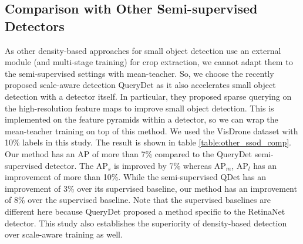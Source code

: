 \subsection{Comparison with Other Semi-supervised Detectors}
As other density-based approaches for small object detection use an external module (and multi-stage training) for crop extraction, we cannot adapt them to the semi-supervised settings with mean-teacher. So, we choose the recently proposed scale-aware detection QueryDet \cite{querydet-Yang-2022} as it also accelerates small object detection with a detector itself. In particular, they proposed sparse querying on the high-resolution feature maps to improve small object detection. This is implemented on the feature pyramids within a detector, so we can wrap the mean-teacher training on top of this method. We used the VisDrone dataset with 10\% labels in this study. The result is shown in table \ref{table:other_ssod_comp}. Our method has an AP of more than 7\% compared to the QueryDet semi-supervised detector. The $\textrm{AP}_{s}$ is improved by 7\% whereas $\textrm{AP}_{m}$, $\textrm{AP}_{l}$ has an improvement of more than 10\%. While the semi-supervised QDet has an improvement of 3\% over its supervised baseline, our method has an improvement of 8\% over the supervised baseline. Note that the supervised baselines are different here because QueryDet proposed a method specific to the RetinaNet \cite{retinanet-Lin-2017} detector. This study also establishes the superiority of density-based detection over scale-aware training as well. 

\begin{table}
    \caption{Performance comparison with QueryDet \cite{querydet-Yang-2022} method for small object detection in the semi-supervised settings using 10\% labeled images on the VisDrone dataset.}
    \centering
    \label{table:other_ssod_comp}
\end{table}

